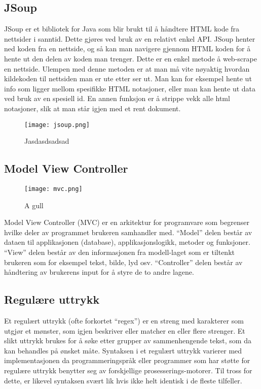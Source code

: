\documentclass[../main.tex]{subfiles}
\begin{document}
\subsection{JSoup}
JSoup er et bibliotek for Java som blir brukt til å håndtere HTML kode fra nettsider i sanntid. Dette gjøres ved bruk av en relativt enkel API. JSoup henter ned koden fra en nettside, og så kan man navigere gjennom HTML koden for å hente ut den delen av koden man trenger. Dette er en enkel metode å web-scrape en nettside. Ulempen med denne metoden er at man må vite nøyaktig hvordan kildekoden til nettsiden man er ute etter ser ut. Man kan for eksempel hente ut info som ligger mellom spesifikke HTML notasjoner, eller man kan hente ut data ved bruk av en spesiell id. En annen funksjon er å strippe vekk alle html notasjoner, slik at man står igjen med et rent dokument.

\begin{figure}[h!]
  \centering
  \texttt{[image: jsoup.png]}
  \caption{Jasdasdsadsad}
\end{figure}

\subsection{Model View Controller}
\begin{wrapfigure}{r}{0.5\textwidth}
  \begin{center}
    \texttt{[image: mvc.png]}
  \end{center}
  \caption{A gull}
\end{wrapfigure}
Model View Controller (MVC) er en arkitektur for programvare som begrenser hvilke deler av programmet brukeren samhandler med. “Model” delen består av dataen til applikasjonen (database), applikasjonslogikk, metoder og funksjoner. “View” delen består av den informasjonen fra modell-laget som er tiltenkt brukeren som for eksempel tekst, bilde, lyd osv. “Controller” delen består av håndtering av brukerens input for å styre de to andre lagene. 

\subsection{Regulære uttrykk}
Et regulært uttrykk (ofte forkortet “regex”) er en streng med karakterer som utgjør et mønster, som igjen beskriver eller matcher en eller flere strenger. Et slikt uttrykk brukes for å søke etter grupper av sammenhengende tekst, som da kan behandles på ønsket måte. Syntaksen i et regulært uttrykk varierer med implementasjonen da programmeringspråk eller programmer som har støtte for regulære uttrykk benytter seg av forskjellige prosesserings-motorer. Til tross for dette, er likevel syntaksen svært lik hvis ikke helt identisk i de fleste tilfeller.
\end{document}
